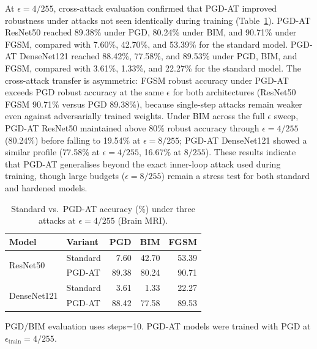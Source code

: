 \documentclass[12pt,a4paper,oneside]{report}
\newcommand{\train}{\mathrm{train}}
\begin{document}
At $\epsilon = 4/255$, cross-attack evaluation confirmed that PGD-AT improved robustness under attacks not seen identically during training (Table~\ref{tab:pgd_at_cross_attack_eps4}). PGD-AT ResNet50 reached 89.38\% under PGD, 80.24\% under BIM, and 90.71\% under FGSM, compared with 7.60\%, 42.70\%, and 53.39\% for the standard model. PGD-AT DenseNet121 reached 88.42\%, 77.58\%, and 89.53\% under PGD, BIM, and FGSM, compared with 3.61\%, 1.33\%, and 22.27\% for the standard model. The cross-attack transfer is asymmetric: FGSM robust accuracy under PGD-AT exceeds PGD robust accuracy at the same $\epsilon$ for both architectures (ResNet50 FGSM 90.71\% versus PGD 89.38\%), because single-step attacks remain weaker even against adversarially trained weights. Under BIM across the full $\epsilon$ sweep, PGD-AT ResNet50 maintained above 80\% robust accuracy through $\epsilon = 4/255$ (80.24\%) before falling to 19.54\% at $\epsilon = 8/255$; PGD-AT DenseNet121 showed a similar profile (77.58\% at $\epsilon = 4/255$, 16.67\% at $8/255$). These results indicate that PGD-AT generalises beyond the exact inner-loop attack used during training, though large budgets ($\epsilon = 8/255$) remain a stress test for both standard and hardened models.

\begin{table}[htbp]
  \centering
  \caption{Standard vs.\ PGD-AT accuracy (\%) under three attacks at $\epsilon=4/255$ (Brain MRI).}
  \label{tab:pgd_at_cross_attack_eps4}
  \begin{tabular}{llrrr}
    \toprule
    Model & Variant & PGD & BIM & FGSM \\
    \midrule
    \multirow{2}{*}{ResNet50}
      & Standard &  7.60 & 42.70 & 53.39 \\
      & PGD-AT   & 89.38 & 80.24 & 90.71 \\
    \midrule
    \multirow{2}{*}{DenseNet121}
      & Standard &  3.61 &  1.33 & 22.27 \\
      & PGD-AT   & 88.42 & 77.58 & 89.53 \\
    \bottomrule
  \end{tabular}
  \vspace{0.25em}
  \begin{minipage}{0.92\linewidth}
    \footnotesize
    PGD/BIM evaluation uses steps=10.
    PGD-AT models were trained with PGD at $\epsilon_{\train}=4/255$.
  \end{minipage}
\end{table}
\end{document}
